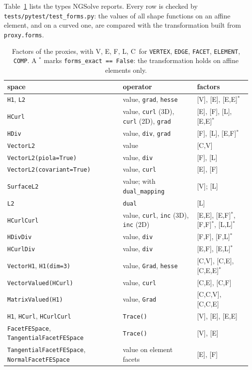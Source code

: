 \documentclass[10pt,a4paper]{article}
\newcommand{\code}[1]{\texttt{#1}}
\newcommand{\VV}{\textsf{V}}
\newcommand{\EE}{\textsf{E}}
\newcommand{\FF}{\textsf{F}}
\newcommand{\LL}{\textsf{L}}
\newcommand{\CC}{\textsf{C}}
\begin{document}
Table~\ref{tab:proxies} lists the types NGSolve reports. Every row is checked by \code{tests/pytest/test\_forms.py}: the values of all shape functions on an affine element, and on a curved one, are compared with the transformation built from \code{proxy.forms}.

\begin{table}[h]\centering\small
\begin{tabular}{@{}lll@{}}\toprule
space & operator & factors \\\midrule
\code{H1}, \code{L2} & value, \code{grad}, \code{hesse} & [\VV], [\EE], [\EE,\EE]$^*$ \\
\code{HCurl} & value, \code{curl} (3D), \code{curl} (2D), \code{grad} & [\EE], [\FF], [\LL], [\EE,\EE]$^*$ \\
\code{HDiv} & value, \code{div}, \code{grad} & [\FF], [\LL], [\EE,\FF]$^*$ \\
\code{VectorL2} & value & [\CC,\VV] \\
\code{VectorL2(piola=True)} & value, \code{div} & [\FF], [\LL] \\
\code{VectorL2(covariant=True)} & value, \code{curl} & [\EE], [\FF] \\
\code{SurfaceL2} & value; with \code{dual\_mapping} & [\VV]; [\LL] \\
\code{L2} & \code{dual} & [\LL] \\
\code{HCurlCurl} & value, \code{curl}, \code{inc} (3D), \code{inc} (2D) & [\EE,\EE], [\EE,\FF]$^*$, [\FF,\FF]$^*$, [\LL,\LL]$^*$ \\
\code{HDivDiv} & value, \code{div} & [\FF,\FF], [\FF,\LL]$^*$ \\
\code{HCurlDiv} & value, \code{div} & [\EE,\FF], [\EE,\LL]$^*$ \\
\code{VectorH1}, \code{H1(dim=3)} & value, \code{Grad}, \code{hesse} & [\CC,\VV], [\CC,\EE], [\CC,\EE,\EE]$^*$ \\
\code{VectorValued(HCurl)} & value, \code{curl} & [\CC,\EE], [\CC,\FF] \\
\code{MatrixValued(H1)} & value, \code{Grad} & [\CC,\CC,\VV], [\CC,\CC,\EE] \\\midrule
\code{H1}, \code{HCurl}, \code{HCurlCurl} & \code{Trace()} & [\VV], [\EE], [\EE,\EE] \\
\code{FacetFESpace}, \code{TangentialFacetFESpace} & \code{Trace()} & [\VV], [\EE] \\
\code{TangentialFacetFESpace}, \code{NormalFacetFESpace} & value on element facets & [\EE], [\FF] \\\bottomrule
\end{tabular}
\caption{Factors of the proxies, with \VV, \EE, \FF, \LL, \CC\ for \code{VERTEX}, \code{EDGE}, \code{FACET}, \code{ELEMENT}, \code{COMP}. A $^*$ marks \code{forms\_exact == False}: the transformation holds on affine elements only.}\label{tab:proxies}
\end{table}
\end{document}
